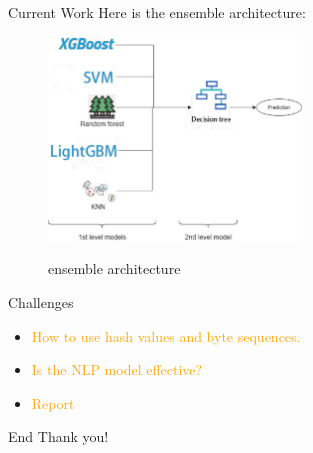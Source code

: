 \documentclass[
 size=14pt,
 paper=smartboard,  %
 mode=present, 		%
 display=slides, 	%
 style=tuliplab,  	%
 pauseslide,
 fleqn,leqno]{powerdot}
\begin{document}
\begin{slide}[toc=,bm=]{Current Work}
Here is the ensemble architecture:
\begin{figure}
	\centering
	\includegraphics[width=0.6\textwidth]{../.././Data/Figures/model stacking.eps}\\
	\caption{ensemble architecture}\label{fig:ensemble architecture}
\end{figure}

\end{slide}


\begin{slide}[toc=,bm=]{Challenges}
\begin{itemize}
	\item \textcolor{orange}{How to use hash values and byte sequences.}
	\item \textcolor{orange}{Is the NLP model effective?}
	\item \textcolor{orange}{Report}
\end{itemize}
\end{slide}



\begin{wideslide}[toc=,bm=]{End}
\centering
{}
\twocolumn[
lcolwidth=0.35\linewidth,
rcolwidth=0.65\linewidth
]
{
}
{
Thank you!
}
\end{wideslide}
\end{document}
